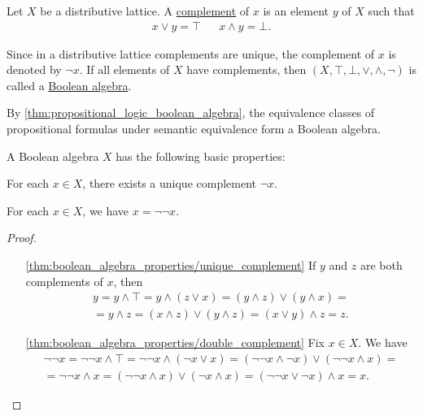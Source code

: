 \begin{definition}\label{def:boolean_algebra}\cite{nLab:boolean_algebra}
  Let $X$ be a distributive lattice. A \ul{complement} of $x$ is an element $y$ of $X$ such that
  \begin{align*}
    x \lor y = \top && x \land y = \bot.
  \end{align*}

  Since in a distributive lattice complements are unique, the complement of $x$ is denoted by $\neg x$. If all elements of $X$ have complements, then $(X, \top, \bot, \lor, \land, \neg)$ is called a \ul{Boolean algebra}.
\end{definition}

\begin{example}\label{ex:boolean_algebra}
  By \cref{thm:propositional_logic_boolean_algebra}, the equivalence classes of propositional formulas under semantic equivalence form a Boolean algebra.
\end{example}

\begin{proposition}\label{thm:boolean_algebra_properties}
  A Boolean algebra $X$ has the following basic properties:
  \begin{defenum}
    \item\label{thm:boolean_algebra_properties/unique_complement} For each $x \in X$, there exists a unique complement $\neg x$.
    \item\label{thm:boolean_algebra_properties/double_complement} For each $x \in X$, we have $x = \neg \neg x$.
  \end{defenum}
\end{proposition}
\begin{proof}\mbox{}
  \begin{itemize}
    \item[\ref{thm:boolean_algebra_properties/unique_complement}] If $y$ and $z$ are both complements of $x$, then
    \begin{align*}
      y
      =
      y \land \top
      =
      y \land (z \lor x)
      =
      (y \land z) \lor (y \land x)
      = \\ =
      y \land z
      =
      (x \land z) \lor (y \land z)
      =
      (x \lor y) \land z
      =
      z.
    \end{align*}

    \item[\ref{thm:boolean_algebra_properties/double_complement}] Fix $x \in X$. We have
    \begin{align*}
      \neg \neg x
      =
      \neg \neg x \land \top
      =
      \neg \neg x \land (\neg x \lor x)
      =
      (\neg \neg x \land \neg x) \lor (\neg \neg x \land x)
      = \\ =
      \neg \neg x \land x
      =
      (\neg \neg x \land x) \lor (\neg x \land x)
      =
      (\neg \neg x \lor \neg x) \land x
      =
      x.
    \end{align*}
  \end{itemize}
\end{proof}
